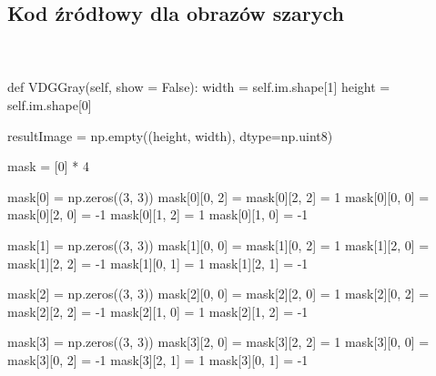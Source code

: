 \documentclass[final,a4paper,openany,12pt]{mwbk}
\begin{document}
\subsection*{Kod źródłowy dla obrazów szarych}
\hfill
\\\\
\noindent def VDGGray(self, show = False): \newline
\indent width = self.im.shape[1] \newline
\indent height = self.im.shape[0] \newline

resultImage = np.empty((height, width), dtype=np.uint8) \newline

mask = [0] * 4 \newline

mask[0] = np.zeros((3, 3)) \newline
\indent mask[0][0, 2] = mask[0][2, 2] = 1 \newline
\indent mask[0][0, 0] = mask[0][2, 0] = -1 \newline
\indent mask[0][1, 2] = 1 \newline
\indent mask[0][1, 0] = -1 \newline

mask[1] = np.zeros((3, 3)) \newline
\indent mask[1][0, 0] = mask[1][0, 2] = 1 \newline
\indent mask[1][2, 0] = mask[1][2, 2] = -1 \newline
\indent mask[1][0, 1] = 1 \newline
\indent mask[1][2, 1] = -1 \newline

mask[2] = np.zeros((3, 3)) \newline
\indent mask[2][0, 0] = mask[2][2, 0] = 1 \newline
\indent mask[2][0, 2] = mask[2][2, 2] = -1 \newline
\indent mask[2][1, 0] = 1 \newline
\indent mask[2][1, 2] = -1 \newline

mask[3] = np.zeros((3, 3)) \newline
\indent mask[3][2, 0] = mask[3][2, 2] = 1 \newline
\indent \indent \indent mask[3][0, 0] = mask[3][0, 2] = -1 \newline
\indent \indent \indent mask[3][2, 1] = 1 \newline
\indent \indent \indent mask[3][0, 1] = -1 \newline
\end{document}
